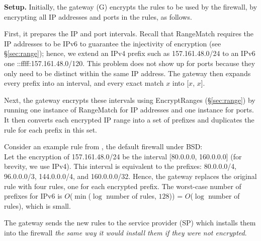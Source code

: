 \noindent\textbf{Setup.} Initially, the gateway (G) encrypts the rules to be used by the firewall, by encrypting all IP addresses and ports in the rules, as follows.

First, it prepares the IP and port intervals. Recall that RangeMatch requires the IP addresses to be IPv6 to guarantee the injectivity of encryption (see \S\ref{sec:range}); hence, we extend an IPv4 prefix  such as 157.161.48.0/24 to an IPv6 one  ::ffff:157.161.48.0/120. 
This problem does not show up for ports because they only need to be distinct within the same IP address.
The gateway then expands every prefix into an interval, and every exact match $x$ into [$x$, $x$]. 

Next, the gateway encrypts these intervals using EncryptRanges (\S\ref{sec:range}) by running one instance of RangeMatch for IP addresses and one instance for ports.
It then converts each encrypted IP range into a set of prefixes and duplicates the rule for each prefix in this set. 

Consider an example rule from  , the 
default firewall under BSD:
  \\ 
Let the encryption of 157.161.48.0/24 be the interval [80.0.0.0, 160.0.0.0] (for brevity, we use IPv4). 
This interval is equivalent to the prefixes: 80.0.0.0/4, 96.0.0.0/3, 144.0.0.0/4, and 160.0.0.0/32. 
Hence, the gateway replaces the original rule with four rules, one for each encrypted prefix. 
The worst-case number of prefixes for IPv6 is $O$($\min$($\log$ number of rules, $128$)) = $O$($\log$ number of rules), 
which is small. 







The gateway sends the new rules to the service provider (SP) which installs them into the firewall {\em the same way it would install 
them if they were not encrypted}. 

